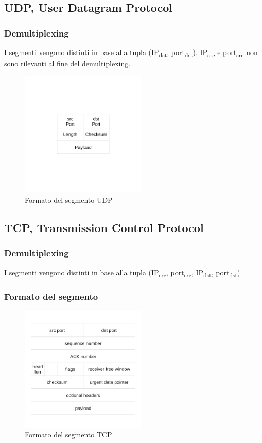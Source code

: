 \documentclass[12pt,a4paper]{article}
\begin{document}
\subsection{UDP, User Datagram Protocol}
\subsubsection{Demultiplexing}
I segmenti vengono distinti in base alla tupla (IP\textsubscript{dst}, port\textsubscript{dst}).
IP\textsubscript{src} e port\textsubscript{src} non sono rilevanti al fine del demultiplexing.

\begin{figure}[H]
  \centering
  \includegraphics[width=6cm]{img/4/udp-head.pdf}
  \caption{Formato del segmento UDP}
\end{figure}

\subsection{TCP, Transmission Control Protocol}
\subsubsection{Demultiplexing}
I segmenti vengono distinti in base alla tupla (IP\textsubscript{src}, port\textsubscript{src}, IP\textsubscript{dst}, port\textsubscript{dst}).

\subsubsection{Formato del segmento}
\begin{figure}[H]
  \centering
  \includegraphics[width=6cm]{img/4/tcp-head.pdf}
  \caption{Formato del segmento TCP}
\end{figure}
\end{document}
